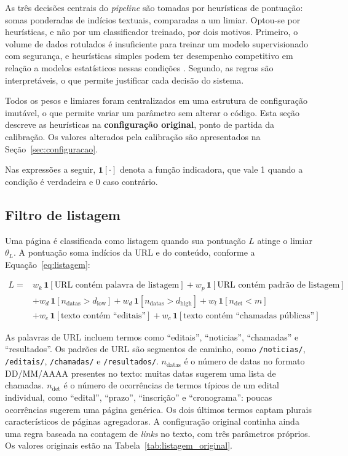 As três decisões centrais do \textit{pipeline} são tomadas por heurísticas de
pontuação: somas ponderadas de indícios textuais, comparadas a um limiar.
Optou-se por heurísticas, e não por um classificador treinado, por dois
motivos. Primeiro, o volume de dados rotulados é insuficiente para treinar um
modelo supervisionado com segurança, e heurísticas simples podem ter
desempenho competitivo em relação a modelos estatísticos nessas condições
\cite{buckmann2017}. Segundo, as regras são interpretáveis, o que permite
justificar cada decisão do sistema.

Todos os pesos e limiares foram centralizados em uma estrutura de configuração
imutável, o que permite variar um parâmetro sem alterar o código. Esta seção
descreve as heurísticas na \textbf{configuração original}, ponto de partida da
calibração. Os valores alterados pela calibração são apresentados na
Seção~\ref{sec:configuracao}.

Nas expressões a seguir, $\mathbf{1}[\cdot]$ denota a função indicadora, que
vale 1 quando a condição é verdadeira e 0 caso contrário.

\subsection{Filtro de listagem}
\label{subsec:listagem}

Uma página é classificada como listagem quando sua pontuação $L$ atinge o
limiar $\theta_L$. A pontuação soma indícios da URL e do conteúdo, conforme a
Equação~\eqref{eq:listagem}:

\begin{equation}
\label{eq:listagem}
\begin{split}
L = {} & w_k \,\mathbf{1}[\text{URL contém palavra de listagem}]
       + w_p \,\mathbf{1}[\text{URL contém padrão de listagem}] \\
     & + w_d \,\mathbf{1}[n_{\mathrm{datas}} > d_{\mathrm{low}}]
       + w_d \,\mathbf{1}[n_{\mathrm{datas}} > d_{\mathrm{high}}]
       + w_l \,\mathbf{1}[n_{\mathrm{det}} < m] \\
     & + w_e \,\mathbf{1}[\text{texto contém ``editais''}]
       + w_c \,\mathbf{1}[\text{texto contém ``chamadas públicas''}]
\end{split}
\end{equation}

As palavras de URL incluem termos como ``editais'', ``noticias'', ``chamadas''
e ``resultados''. Os padrões de URL são segmentos de caminho, como
\texttt{/noticias/}, \texttt{/editais/}, \texttt{/chamadas/} e
\texttt{/resultados/}. $n_{\mathrm{datas}}$ é o número de datas no formato
DD/MM/AAAA presentes no texto: muitas datas sugerem uma lista de chamadas.
$n_{\mathrm{det}}$ é o número de ocorrências de termos típicos de um edital
individual, como ``edital'', ``prazo'', ``inscrição'' e ``cronograma'': poucas
ocorrências sugerem uma página genérica. Os dois últimos termos captam plurais
característicos de páginas agregadoras. A configuração original continha ainda
uma regra baseada na contagem de \textit{links} no texto, com três parâmetros
próprios. Os valores originais estão na Tabela~\ref{tab:listagem_original}.

